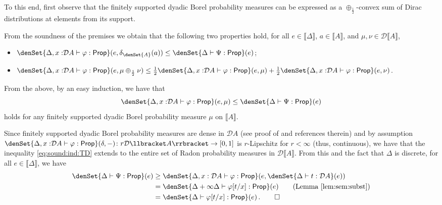 \documentclass[a4paper,UKenglish,cleveref, autoref, thm-restate]{lipics-v2021}
\newcommand{\D}{\mathcal{D}}
\newcommand{\ts}{\vdash}
\newcommand{\hastype}[3]{#1\ts #2 : #3}
\newcommand{\Prop}{\mathsf{Prop}}
\newcommand{\den}[1]{\llbracket #1\rrbracket}
\begin{document}
\begin{description}[font=\sc,wide]
    To this end, first observe that the finitely supported dyadic Borel probability measures
    can be expressed as a $\oplus_{\frac 12}$-convex sum of Dirac distributions 
    at elements from its support. 
    
    From the soundness of the premises we obtain that the following two properties hold, for all $e \in \den\Delta$, $a\in \den A$, 
    and $\mu,\nu \in \D \den{A}$,
    \begin{itemize}
        \item $\denSet{\hastype{\Delta, {x:}\D A}{\varphi}{\Prop}}(e,\delta_{\denSet{A}}(a)) 
        \leq \denSet{\hastype{\Delta}{\Psi}{\Prop}}(e)$;
        \item $\denSet{\hastype{\Delta, {x:}\D A}{\varphi}{\Prop}}(e,\mu \oplus_{\frac12} \nu ) 
        \leq \frac12 \denSet{\hastype{\Delta, {x:}\D A}{\varphi}{\Prop}}(e,\mu) + 
            \frac12 \denSet{\hastype{\Delta, {x:}\D A}{\varphi}{\Prop}}(e,\nu)$.
    \end{itemize}
    From the above, by an easy induction, we have that 
    \begin{equation} \label{eq:sound:ind:TD}
        \denSet{\hastype{\Delta, {x:}\D A}{\varphi}{\Prop}}(e,\mu) \leq \denSet{\hastype{\Delta}{\Psi}{\Prop}}(e)
    \end{equation}
    holds for any finitely supported dyadic Borel probability measure $\mu$ on $\den A$.

   Since finitely supported dyadic Borel probability measures are dense in $\D A$ (see proof of \cite[Theorem 21]{BreugelHMW07} and references therein) and by assumption $\denSet{\hastype{\Delta, {x:}\D A}{\varphi}{\Prop}}(\delta, -) \colon r \D\den{A} \to [0,1]$ is $r$-Lipschitz for $r < \infty$ (thus, continuous), we have that the inequality
   \eqref{eq:sound:ind:TD} extends to the entire set of Radon probability measures in $\D \den A$.
   From this and the fact that $\Delta$ is discrete, for all $e\in \den\Delta$, we have
    \begin{align*}
        \denSet{\hastype{\Delta}{\Psi}{\Prop}}(e)
        &\geq \denSet{\hastype{\Delta, x:\D A}{\varphi}{\Prop}}(e,
        \denSet{\hastype{\Delta}{t}{\D A}}(e)) \\
        &= \denSet{\hastype{\Delta+\infty\Delta}{\varphi[t/x]}{\Prop}}(e)
        \tag{Lemma~\ref{lem:sem:subst}}\\
        &= \denSet{\hastype{\Delta}{\varphi[t/x]}{\Prop}}(e) \,.
        \qedhere
    \end{align*}
\end{description}
\end{document}
